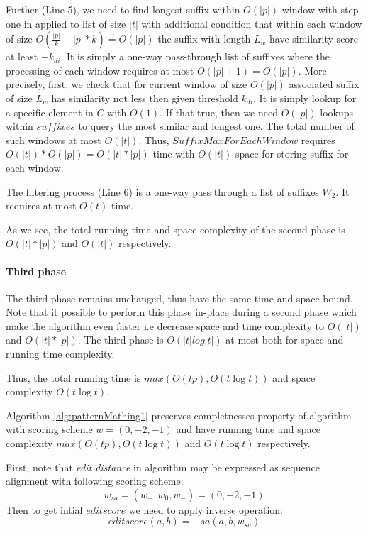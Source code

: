 Further (Line 5), we need to find longest suffix within $O(|p|)$ window with step one in applied  to list of size $|t|$ with additional condition that within each window of size $O(\frac{|p|}{k}-|p|*k)=O(|p|)$ the suffix with length $L_{w}$ have similarity score at least $-k_{di}$.
It is simply a one-way pass-through list of suffixes where the processing of each window requires at most $O(|p|+1)=O(|p|)$.
More precisely, first, we check that for current window of size $O(|p|)$
associated suffix of size $L_{w}$ has similarity not less then given threshold $k_{di}$.
It is simply lookup for a specific element in $C$ with $O(1)$.
If that true, then we need $O(|p|)$ lookups within $suffixes$ to query the most similar and longest one.    
The total number of such windows at most $O(|t|)$.
Thus, $SuffixMaxForEachWindow$ requires $O(|t|)*O(|p|)=O(|t|*|p|)$ time with $O(|t|)$ space for storing suffix for each window. 

The filtering process (Line 6) is a one-way pass through a list of suffixes $W_2$.
It requires at most $O(t)$ time.

As we see, the total running time and space complexity of the second phase is $O(|t|*|p|)$ and $O(|t|)$ respectively.

\paragraph{Third phase}
The third phase remains unchanged, thus have the same time and space-bound.
Note that it possible to perform this phase in-place during a second phase which 
make the algorithm even faster i.e decrease space and time complexity to $O(|t|)$  and $O(|t|*|p|)$.
The third phase is $O(|t| log|t|)$  at most both for space and running time complexity.

Thus, the total running time is $max(O(tp),O(t \log t))$ and space complexity $O(t \log t)$. 


\begin{theorem}
Algorithm \ref{alg:patternMathing1} preserves completnesses property of algorithm \cite{luciv2019interactive} with scoring scheme  $w = (0,-2,-1)$ and have running time and space complexity $max(O(tp),O(t \log t))$ and $O(t \log t)$  respectively.
\end{theorem}

First, note  that \emph{edit distance} in algorithm \cite{.} may be expressed as sequence alignment  with following scoring scheme: 
\begin{displaymath}
w_{sa}=(w_{+},w_{0},w_{-}) = (0,-2,-1)
\end{displaymath}
Then to get intial $edit score$ we need to apply inverse operation:
\begin{equation}\label{editsa}
editscore(a,b) = -sa(a,b,w_{sa}) 
\end{equation}

